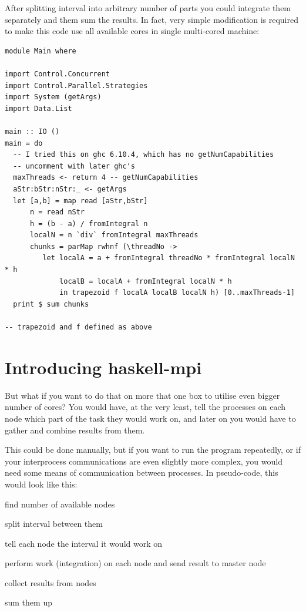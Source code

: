 \documentclass{tmr}
\begin{document}
After splitting interval into arbitrary number of parts you could
integrate them separately and them sum the results. In fact, very
simple modification is required to make this code use all available
cores in single multi-cored machine:
\begin{Verbatim}
module Main where

import Control.Concurrent
import Control.Parallel.Strategies
import System (getArgs)
import Data.List

main :: IO ()
main = do
  -- I tried this on ghc 6.10.4, which has no getNumCapabilities
  -- uncomment with later ghc's
  maxThreads <- return 4 -- getNumCapabilities
  aStr:bStr:nStr:_ <- getArgs
  let [a,b] = map read [aStr,bStr]
      n = read nStr
      h = (b - a) / fromIntegral n
      localN = n `div` fromIntegral maxThreads
      chunks = parMap rwhnf (\threadNo ->
         let localA = a + fromIntegral threadNo * fromIntegral localN * h
             localB = localA + fromIntegral localN * h
             in trapezoid f localA localB localN h) [0..maxThreads-1]
  print $ sum chunks

-- trapezoid and f defined as above
\end{Verbatim}


\section{Introducing haskell-mpi}

But what if you want to do that on more that one box to utilise even
bigger number of cores? You would have, at the very least, tell the
processes on each node which part of the task they would work on, and
later on you would have to gather and combine results from them.

This could be done manually, but if you want to run the program
repeatedly, or if your interprocess communications are even slightly
more complex, you would need some means of communication between
processes. In pseudo-code, this would look like this:

\begin{compactitem}
\item find number of available nodes
\item split interval between them
\item tell each node the interval it would work on
\item perform work (integration) on each node and send result to master node
\item collect results from nodes
\item sum them up
\end{compactitem}
\end{document}
